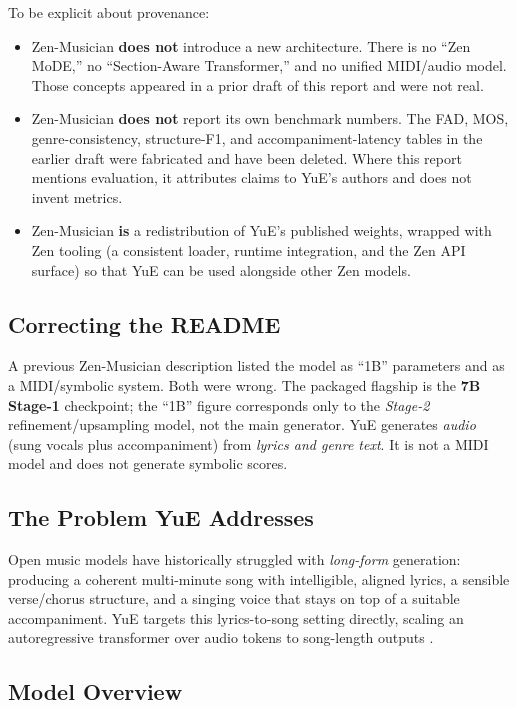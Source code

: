 \documentclass[11pt,a4paper]{article}
\begin{document}
To be explicit about provenance:

\begin{itemize}
    \item Zen-Musician \textbf{does not} introduce a new architecture. There is
    no ``Zen MoDE,'' no ``Section-Aware Transformer,'' and no unified
    MIDI/audio model. Those concepts appeared in a prior draft of this report and
    were not real.
    \item Zen-Musician \textbf{does not} report its own benchmark numbers. The FAD,
    MOS, genre-consistency, structure-F1, and accompaniment-latency tables in the
    earlier draft were fabricated and have been deleted. Where this report
    mentions evaluation, it attributes claims to YuE's authors and does not invent
    metrics.
    \item Zen-Musician \textbf{is} a redistribution of YuE's published weights,
    wrapped with Zen tooling (a consistent loader, runtime integration, and the
    Zen API surface) so that YuE can be used alongside other Zen models.
\end{itemize}

\subsection{Correcting the README}

A previous Zen-Musician description listed the model as ``1B'' parameters and as a
MIDI/symbolic system. Both were wrong. The packaged flagship is the
\textbf{7B Stage-1} checkpoint; the ``1B'' figure corresponds only to the
\emph{Stage-2} refinement/upsampling model, not the main generator. YuE generates
\emph{audio} (sung vocals plus accompaniment) from \emph{lyrics and genre text}.
It is not a MIDI model and does not generate symbolic scores.

\subsection{The Problem YuE Addresses}

Open music models have historically struggled with \emph{long-form} generation:
producing a coherent multi-minute song with intelligible, aligned lyrics, a
sensible verse/chorus structure, and a singing voice that stays on top of a
suitable accompaniment. YuE targets this lyrics-to-song setting directly, scaling
an autoregressive transformer over audio tokens to song-length outputs
\cite{yuan2025yue}.

\subsection{Model Overview}
\end{document}
